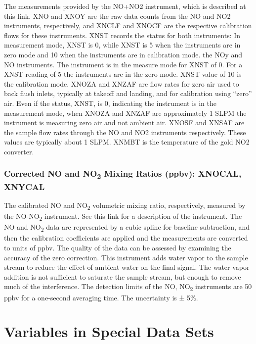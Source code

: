 \documentclass[
]{book}
\begin{document}
The measurements provided by the NO+NO{2} instrument, which is described at this link. XNO and XNOY are the raw data counts from the NO and NO{2} instruments, respectively, and XNCLF and XNOCF are the respective calibration flows for these instruments. XNST records the status for both instruments: In measurement mode, XNST is 0, while XNST is 5 when the instruments are in zero mode and 10 when the instruments are in calibration mode. the NOy and NO instruments. The instrument is in the measure mode for XNST of 0. For a XNST reading of 5 the instruments are in the zero mode. XNST value of 10 is the calibration mode. XNOZA and XNZAF are flow rates for zero air used to back flush inlets, typically at takeoff and landing, and for calibration using ``zero'' air. Even if the status, XNST, is 0, indicating the instrument is in the measurement mode, when XNOZA and XNZAF are approximately 1 SLPM the instrument is measuring zero air and not ambient air. XNOSF and XNSAF are the sample flow rates through the NO and NO{2} instruments respectively. These values are typically about 1 SLPM. XNMBT is the temperature of the gold NO{2} converter.

\hypertarget{mr-no-no2}{%
\subsubsection*{\texorpdfstring{Corrected NO and NO\textsubscript{2} Mixing Ratios (ppbv): XNOCAL, XNYCAL}{Corrected NO and NO2 Mixing Ratios (ppbv): XNOCAL, XNYCAL}}\label{mr-no-no2}}

The calibrated NO and NO\textsubscript{2} volumetric mixing ratio, respectively, measured by the NO-NO\textsubscript{2} instrument. See this link for a description of the instrument. The NO and NO\textsubscript{2} data are represented by a cubic spline for baseline subtraction, and then the calibration coefficients are applied and the measurements are converted to units of ppbv. The quality of the data can be assessed by examining the accuracy of the zero correction. This instrument adds water vapor to the sample stream to reduce the effect of ambient water on the final signal. The water vapor addition is not sufficient to saturate the sample stream, but enough to remove much of the interference. The detection limits of the NO, NO\textsubscript{2} instruments are 50 ppbv for a one-second averaging time. The uncertainty is {±} 5\%.

\hypertarget{awas-cims-qcls-toga}{%
\section{Variables in Special Data Sets}\label{awas-cims-qcls-toga}}
\end{document}
